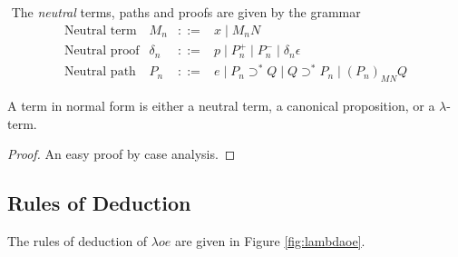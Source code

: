 \documentclass[a4paper,UKenglish]{lipics-v2016}
\theoremstyle{plain}
\theoremstyle{definition}
\begin{document}
\begin{definition}[Neutral]$ $
The \emph{neutral} terms, paths and proofs are given by the grammar
\[ \begin{array}{lrcl}
\text{Neutral term} & M_n & ::= & x \mid M_n N \\
\text{Neutral proof} & \delta_n & ::= & p \mid P_n^+ \mid P_n^- \mid \delta_n \epsilon \\
\text{Neutral path} & P_n & ::= & e \mid P_n \supset^* Q \mid Q \supset^* P_n \mid (P_n)_{MN} Q
\end{array} \]
\end{definition}

\begin{lemma}
A term in normal form is either a neutral term, a canonical proposition, or a $\lambda$-term.
\end{lemma}

\begin{proof}
An easy proof by case analysis.
\end{proof}

\subsection{Rules of Deduction}

The rules of deduction of $\lambda o e$ are given in Figure \ref{fig:lambdaoe}.
\end{document}
